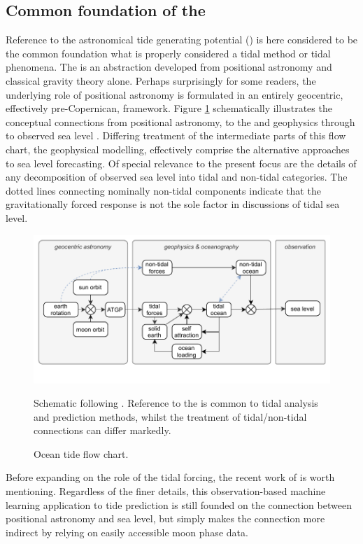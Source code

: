 \subsection{Common foundation of the \ATGP{}}
Reference to the astronomical tide generating potential (\ATGP{}) is here considered to be the common foundation what is properly considered a tidal method or tidal phenomena.  
The \ATGP{} is an abstraction developed from positional astronomy and classical gravity theory alone.   Perhaps surprisingly for some readers, the underlying role of positional astronomy is formulated in an entirely geocentric, effectively pre-Copernican, framework. 
Figure \ref{fig:tideForceFlow} schematically illustrates the conceptual connections from positional astronomy, to the \ATGP{} and geophysics through to observed sea level .  
Differing treatment of the intermediate parts of this flow chart, the geophysical modelling, effectively comprise the alternative approaches to sea level forecasting.  Of special relevance to the present focus are the details of any decomposition of observed sea level into tidal and non-tidal categories.   The dotted lines connecting nominally non-tidal components indicate that the gravitationally forced response is not the sole factor in discussions of tidal sea level. 
\begin{figure}[!hbt] \centering
    \includegraphics[width=\figwidthFull]{figures/diagrams/tidal_force_flowchart.pdf}
    \caption{Ocean tide flow chart.}{Schematic following \citet{agnew2015}.  Reference to the \ATGP{} is common to tidal analysis and prediction methods, whilst the treatment of tidal/non-tidal connections can differ markedly.}
    \label{fig:tideForceFlow}
\end{figure}
Before expanding on the role of the tidal forcing, the recent work of \citep{10.1016/j.oceaneng.2020.107013} is worth mentioning.   Regardless of the finer details, this observation-based machine learning application to tide prediction is still founded on the connection between positional astronomy and sea level, but simply makes the connection more indirect by relying on easily accessible moon phase data.
